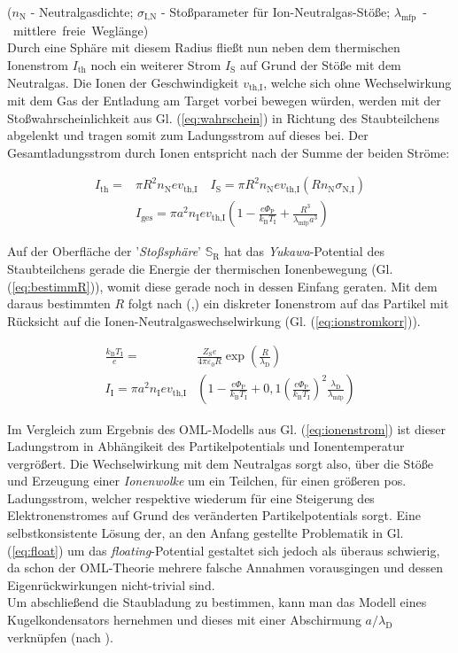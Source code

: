 \documentclass[numbers=noenddot,a4paper]{scrartcl}
\newcommand{\ix}[1]{_\text{#1}}
\newcommand{\tilt}[1]{\textit{#1}}
\begin{document}
			($n\ix{N}$ - Neutralgasdichte; $\sigma\ix{I,N}$ - Stoßparameter für Ion-Neutralgas-Stöße; \mbox{$\lambda\ix{mfp}$ - mittlere freie Wegl\"ange})\\
			Durch eine Sph\"are mit diesem Radius flie{\ss}t nun neben dem thermischen Ionenstrom $I\ix{th}$ noch ein weiterer Strom $I\ix{S}$ auf Grund der St\"o{\ss}e mit dem Neutralgas. Die Ionen der Geschwindigkeit $v\ix{th,I}$, welche sich ohne Wechselwirkung mit dem Gas der Entladung am Target vorbei bewegen w\"urden, werden mit der Sto{\ss}wahrscheinlichkeit aus Gl. (\ref{eq:wahrschein}) in Richtung des Staubteilchens abgelenkt und tragen somit zum Ladungsstrom auf dieses bei. Der Gesamtladungsstrom durch Ionen entspricht nach \cite{Lampe01} der Summe der beiden Str\"ome:

				\begin{align}
					I\ix{th}=&\pi R^{2}n\ix{N}ev\ix{th,I} \quad I\ix{S}=\pi R^2n\ix{N}ev\ix{th,I}\left(Rn\ix{N}\sigma\ix{N,I}\right) \\
					&I\ix{ges}=\pi a^{2}n\ix{I}ev\ix{th,I}\left(1-\frac{e\Phi\ix{P}}{k\ix{B}T\ix{I}}+\frac{R^{3}}{\lambda\ix{mfp}a^{3}}\right)
				\end{align}

			Auf der Oberfl\"ache der '\tilt{Sto{\ss}sph\"are}' $\mathbb{S}\ix{R}$ hat das \tilt{Yukawa}-Potential des Staubteilchens gerade die Energie der thermischen Ionenbewegung (Gl. (\ref{eq:bestimmR})), womit diese gerade noch in dessen Einfang geraten. Mit dem daraus bestimmten $R$ folgt nach (\cite{Melzer12},\cite{Khrapak05a}) ein diskreter Ionenstrom auf das Partikel mit R\"ucksicht auf die Ionen-Neutralgaswechselwirkung (Gl. (\ref{eq:ionstromkorr})).

				\begin{align}
					\frac{k\ix{B}T\ix{I}}{e}=&\frac{Z\ix{S}e}{4\pi\varepsilon\ix{0}R}\exp\left(\frac{R}{\lambda\ix{D}}\right) \label{eq:bestimmR} \\
					I\ix{I}=\pi a^{2} n\ix{I}e v\ix{th,I}&\left(1-\frac{e\Phi\ix{P}}{k\ix{B}T\ix{I}}+0,1\left(\frac{e\Phi\ix{P}}{k\ix{B}T\ix{I}}\right)^{2}\frac{\lambda\ix{D}}{\lambda\ix{mfp}}\right) \label{eq:ionstromkorr}
				\end{align}

			Im Vergleich zum Ergebnis des OML-Modells aus Gl. (\ref{eq:ionenstrom}) ist dieser Ladungstrom in Abh\"angikeit des Partikelpotentials und Ionentemperatur vergr\"o{\ss}ert. Die Wechselwirkung mit dem Neutralgas sorgt also, \"uber die St\"o{\ss}e und Erzeugung einer \tilt{Ionenwolke} um ein Teilchen, f\"ur einen gr\"o{\ss}eren pos. Ladungsstrom, welcher respektive wiederum f\"ur eine Steigerung des Elektronenstromes auf Grund des ver\"anderten Partikelpotentials sorgt. Eine selbstkonsistente L\"osung der, an den Anfang gestellte Problematik in Gl. (\ref{eq:float}) um das \tilt{floating}-Potential gestaltet sich jedoch als \"uberaus schwierig, da schon der OML-Theorie mehrere falsche Annahmen vorausgingen und dessen Eigenr\"uckwirkungen nicht-trivial sind.\\
			Um abschließend die Staubladung zu bestimmen, kann man das Modell eines Kugelkondensators hernehmen und dieses mit einer Abschirmung $a/\lambda\ix{D}$ verknüpfen (nach \cite{Melzer12}).
\end{document}
